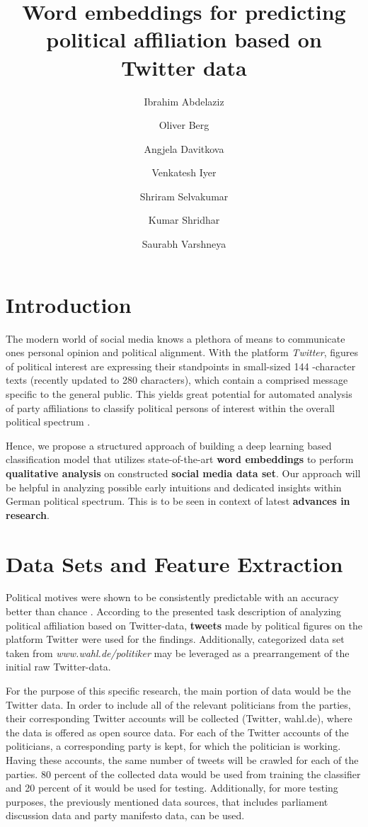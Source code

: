 \documentclass[10pt, oneside]{article}
\title{Word embeddings for predicting political affiliation based on Twitter data}
\author[]{Ibrahim Abdelaziz}
\author[]{Oliver Berg}
\author[]{Angjela Davitkova}
\author[]{Venkatesh Iyer}
\author[]{Shriram Selvakumar}
\author[]{Kumar Shridhar}
\author[]{Saurabh Varshneya}
\affil[1]{Technische Universität Kaiserslautern}
\begin{document}
\maketitle
\begin{multicols}{2}


\section{Introduction}

The modern world of social media knows a plethora of means to communicate ones personal opinion and political alignment. With the platform \textit{Twitter}, figures of political interest are expressing their standpoints in small-sized 144 -character texts (recently updated to 280 characters), which contain a comprised message specific to the general public. This yields great potential for automated analysis of party affiliations to classify political persons of interest within the overall political spectrum \cite{Biessmann2017}.

Hence, we propose a structured approach of building a deep learning based classification model that utilizes state-of-the-art \textbf{word embeddings} \cite{Pelevinala2016} to perform \textbf{qualitative analysis} on constructed \textbf{social media data set}. Our approach will be helpful in analyzing possible early intuitions and dedicated insights within German political spectrum.
This is to be seen in context of latest \textbf{advances in research}.

\section{Data Sets and Feature Extraction} 

Political motives were shown to be consistently predictable with an accuracy better than chance \cite{Biessmann2017}.
According to the presented task description of analyzing political affiliation based on Twitter-data, \textbf{tweets} made by political figures on the platform Twitter were used for the findings.
Additionally, categorized data set taken from \textit{www.wahl.de/politiker} may be leveraged as a prearrangement of the initial raw Twitter-data.

For the purpose of this specific research, the main portion of data would be the Twitter data. In order to include all of the relevant politicians from the parties, their corresponding Twitter accounts will be collected (Twitter, wahl.de), where the data is offered as open source data.
For each of the Twitter accounts of the politicians, a corresponding party is kept, for which the politician is working. Having these accounts, the same number of tweets will be crawled for each of the parties. 80 percent of the collected data would be used from training the classifier and 20 percent of it would be used for testing.
Additionally, for more testing purposes, the previously mentioned data sources, that includes parliament discussion data and party manifesto data, can be used. 


\end{multicols}
\end{document}
